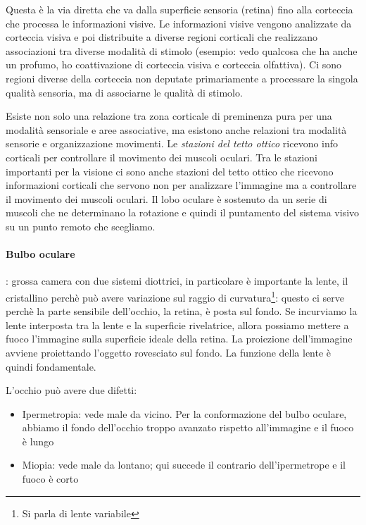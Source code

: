 \documentclass[a4paper,12pt]{article}
\begin{document}
Questa è la via diretta che va dalla superficie sensoria (retina) fino alla corteccia che processa le informazioni visive. Le informazioni visive vengono analizzate da corteccia visiva e poi distribuite a diverse regioni corticali che realizzano associazioni tra diverse modalità di stimolo (esempio: vedo qualcosa che ha anche un profumo, ho coattivazione di corteccia visiva e corteccia olfattiva). Ci sono regioni diverse della corteccia non deputate primariamente a processare la singola qualità sensoria, ma di associarne le qualità di stimolo. 

Esiste non solo una relazione tra zona corticale di preminenza pura per una modalità sensoriale e aree associative, ma esistono anche relazioni tra modalità sensorie e organizzazione movimenti. Le \emph{stazioni del tetto ottico} ricevono info corticali per controllare il movimento dei muscoli oculari. Tra le stazioni importanti per la visione ci sono anche stazioni del tetto ottico che ricevono informazioni corticali che servono non per analizzare l'immagine ma a controllare il movimento dei muscoli oculari. Il lobo oculare è sostenuto da un serie di muscoli che ne determinano la rotazione e quindi il puntamento del sistema visivo su un punto remoto che scegliamo.

\paragraph{Bulbo oculare}: grossa camera con due sistemi diottrici, in particolare è importante la lente, il cristallino perchè può avere variazione sul raggio di curvatura\footnote{Si parla di lente variabile}: questo ci serve perchè la parte sensibile dell'occhio, la retina, è posta sul fondo. Se incurviamo la lente interposta tra la lente e la superficie rivelatrice, allora possiamo mettere a fuoco l'immagine sulla superficie ideale della retina. La proiezione dell'immagine avviene proiettando l'oggetto rovesciato sul fondo. La funzione della lente è quindi fondamentale.

L'occhio può avere due difetti: 

\begin{itemize}
\item{Ipermetropia: vede male da vicino. Per la conformazione del bulbo oculare, abbiamo il fondo dell'occhio troppo avanzato rispetto all'immagine e il fuoco è lungo}
\item{Miopia: vede male da lontano; qui succede il contrario dell'ipermetrope e il fuoco è corto}
\end{itemize}
\end{document}
